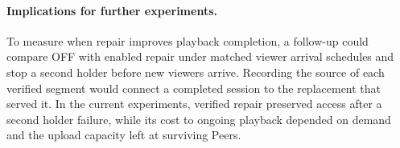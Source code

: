 \paragraph{Implications for further experiments.}
To measure when repair improves playback completion, a follow-up could
compare OFF with enabled repair under matched viewer arrival schedules and stop
a second holder before new viewers arrive. Recording the source of each
verified segment would connect a completed session to the replacement
that served it. In the current experiments, verified repair preserved
access after a second holder failure, while its cost to ongoing playback
depended on demand and the upload capacity left at surviving Peers.
